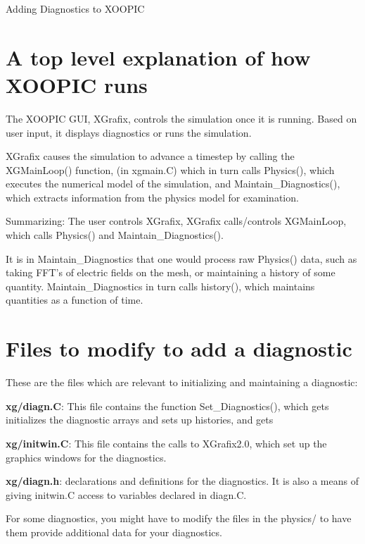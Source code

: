 \pagestyle{empty}
\topmargin -0.60in
\oddsidemargin 0.0625in
\textheight 9.00in
\textwidth 6.50in
\renewcommand{\baselinestretch}{1.4}
\parskip 0.20in


\Huge
\begin{center}
Adding Diagnostics to XOOPIC
\end{center}
\large

\section{A top level explanation of how XOOPIC runs}

The XOOPIC GUI, XGrafix, controls the simulation once it is running.
Based on user input, it displays diagnostics or runs the simulation.

XGrafix causes the simulation to advance a timestep by calling the
XGMainLoop() function, (in xgmain.C) which in turn calls Physics(),
which executes the numerical model of the simulation, and 
Maintain\_Diagnostics(), which extracts information from the physics
model for examination.

Summarizing:
The user controls XGrafix, XGrafix calls/controls XGMainLoop, which
calls Physics() and Maintain\_Diagnostics().

It is in Maintain\_Diagnostics that one would process raw Physics() data,
such as taking FFT's of electric fields on the mesh, or maintaining
a history of some quantity.  Maintain\_Diagnostics in turn calls history(),
which maintains quantities as a function of time.

\section{Files to modify to add a diagnostic}

These are the files which are relevant to initializing and maintaining
a diagnostic:

{\bf xg/diagn.C}:  This file contains the function Set\_Diagnostics(),
which gets initializes the diagnostic arrays and sets up histories,
and gets 

{\bf xg/initwin.C}:  This file contains the calls to XGrafix2.0, which set
up the graphics windows for the diagnostics.

{\bf xg/diagn.h}:  declarations and definitions for the diagnostics.  It is
also a means of giving initwin.C access to variables declared in diagn.C.

For some diagnostics, you might have to modify the files in the physics/
to have them provide additional data for your diagnostics.

